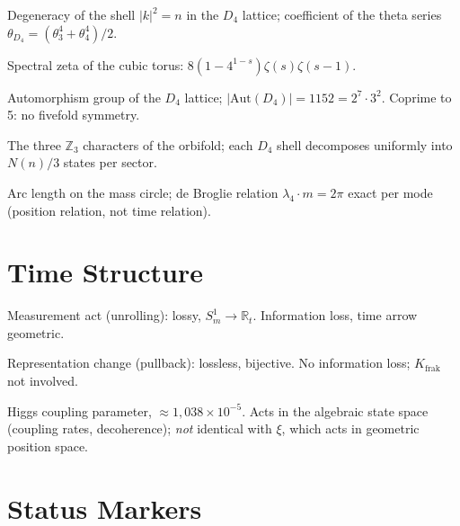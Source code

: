 \begin{description}[leftmargin=4.5em,style=sameline,itemsep=0.4em]
  \item[$N(n)$] Degeneracy of the shell $|k|^2 = n$ in the $D_4$ lattice;
    coefficient of the theta series
    $\theta_{D_4} = (\theta_3^4+\theta_4^4)/2$.
  \item[$Z_{\mathbb{Z}^4}(s)$] Spectral zeta of the cubic torus:
    $8(1-4^{1-s})\zeta(s)\zeta(s-1)$.
  \item[$\mathrm{Aut}(D_4)$] Automorphism group of the $D_4$ lattice;
    $|\mathrm{Aut}(D_4)| = 1152 = 2^7\cdot3^2$. Coprime to 5:
    no fivefold symmetry.
  \item[$\chi_0,\chi_1,\chi_2$] The three $\mathbb{Z}_3$ characters of the
    orbifold; each $D_4$ shell decomposes uniformly into
    $N(n)/3$ states per sector.
  \item[$\lambda_4$] Arc length on the mass circle; de Broglie relation
    $\lambda_4\cdot m = 2\pi$ exact per mode (position relation, not
    time relation).
\end{description}

\section*{Time Structure}

\begin{description}[leftmargin=4.5em,style=sameline,itemsep=0.4em]
  \item[Type I] Measurement act (unrolling): lossy, $S^1_m\to\mathbb{R}_t$.
    Information loss, time arrow geometric.
  \item[Type III] Representation change (pullback): lossless, bijective.
    No information loss; $K_{\mathrm{frak}}$ not involved.
  \item[$\xi_{\mathrm{Higgs}}$] Higgs coupling parameter,
    $\approx 1{,}038\times10^{-5}$. Acts in the algebraic
    state space (coupling rates, decoherence); \emph{not} identical
    with $\xi$, which acts in geometric position space.
\end{description}

\section*{Status Markers}

